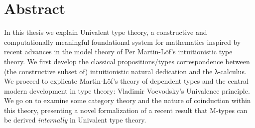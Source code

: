\chapter*{Abstract}

In this thesis we explain Univalent type theory, a constructive and
computationally meaningful foundational system for mathematics inspired by
recent advances in the model theory of Per Martin-L\"of's intuitionistic type
theory. We first develop the classical propositions/types correspondence between
(the constructive subset of) intuitionistic natural dedication and the
λ-calculus. We proceed to explicate Martin-L\"of's theory of dependent types and
the central modern development in type theory: Vladimir Voevodsky's Univalence
principle. We go on to examine some category theory and the nature of coinduction
within this theory, presenting a novel formalization of a recent result that
M-types can be derived \textit{internally} in Univalent type theory.
